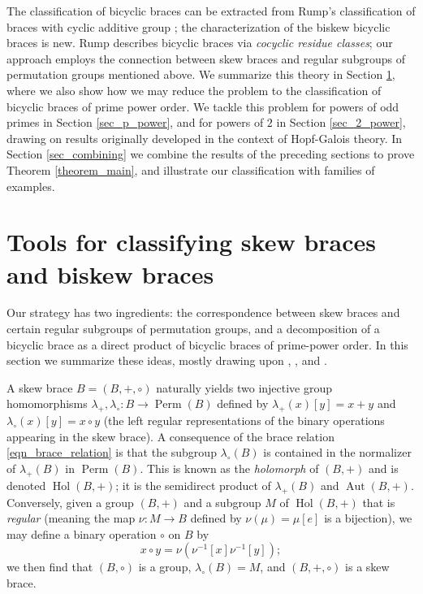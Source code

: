 \documentclass[reqno]{amsart}
\theoremstyle{definition}
\DeclareMathOperator{\Perm}{\mbox{Perm}}
\DeclareMathOperator{\Hol}{\mbox{Hol}}
\DeclareMathOperator{\Aut}{\mbox{Aut}}
\begin{document}
The classification of bicyclic braces can be extracted from Rump's classification of braces with cyclic additive group \cite{Ru07b}; the characterization of the biskew bicyclic braces is new. Rump describes bicyclic braces via \textit{cocyclic residue classes}; our approach employs the connection between skew braces and regular subgroups of permutation groups mentioned above. We summarize this theory in Section \ref{sec_tools}, where we also show how we may reduce the problem to the classification of bicyclic braces of prime power order. We tackle this problem for powers of odd primes in Section \ref{sec_p_power}, and for powers of $ 2 $ in Section \ref{sec_2_power}, drawing on results originally developed in the context of Hopf-Galois theory. In Section \ref{sec_combining} we combine the results of the preceding sections to prove Theorem \ref{theorem_main}, and illustrate our classification with families of examples. 

\section{Tools for classifying skew braces and biskew braces} \label{sec_tools}

Our strategy has two ingredients: the correspondence between skew braces and certain regular subgroups of permutation groups, and a decomposition of a bicyclic brace as a direct product of bicyclic braces of prime-power order. In this section we summarize these ideas, mostly drawing upon \cite{GV17}, \cite{SV18}, and \cite{HAGMT}. 

A skew brace $ B=(B,+,\circ) $ naturally yields two injective group homomorphisms $ \lambda_{+}, \lambda_{\circ} : B \rightarrow \Perm(B) $ defined by $ \lambda_{+}(x)[y]=x+y $ and  $ \lambda_{\circ}(x)[y] = x \circ y $ (the left regular representations of the binary operations appearing in the skew brace). A consequence of the brace relation \eqref{eqn_brace_relation} is that the subgroup $ \lambda_{\circ}(B) $ is contained in the normalizer of $ \lambda_{+}(B) $ in $ \Perm(B) $. This is known as the \textit{holomorph} of $ (B,+) $ and is denoted $ \Hol(B,+) $; it is the semidirect product of $ \lambda_{+}(B) $ and $ \Aut(B,+) $. Conversely, given a group $ (B,+) $ and a subgroup $ M $ of $ \Hol(B,+) $ that is \textit{regular} (meaning the map $ \nu : M \rightarrow B $ defined by $ \nu(\mu) = \mu[e] $ is a bijection), we may define a binary operation $ \circ $ on $ B $ by
\[ x \circ y = \nu ( \nu^{-1}[x] \nu^{-1}[y] ); \]
we then find that $ (B,\circ) $ is a group, $ \lambda_{\circ}(B) = M $, and $ (B,+,\circ) $ is a skew brace. 
\end{document}
